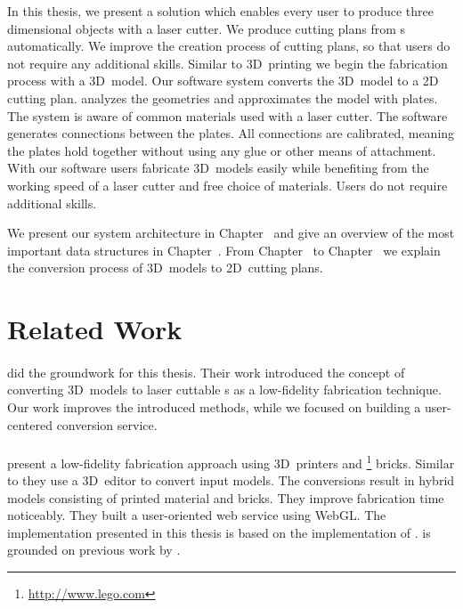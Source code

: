 \documentclass[../ClassicThesis.tex]{subfiles}
\begin{document}
In this thesis, we present a solution which enables every
user to produce three dimensional objects with a laser
cutter. We produce cutting plans from {\threedmodel}s
automatically. We improve the creation process of cutting
plans, so that users do not require any additional skills.
Similar to 3D~printing we begin the fabrication process with
a 3D~model.
Our software system {\platener} converts the 3D~model to a
2D cutting plan. {\platener} analyzes the geometries and
approximates the model with plates. The system is aware of
common materials used with a laser cutter. The software
generates connections between the plates. All connections
are calibrated, meaning the plates hold together without
using any glue or other means of attachment. With our
software users fabricate 3D~models easily while benefiting
from the working speed of a laser cutter and free choice of
materials. Users do not require additional skills.



We present our system architecture in
Chapter~ and give an overview of the
most important data structures in
Chapter~. From
Chapter~ to Chapter~ we
explain the conversion process of 3D~models to 2D~cutting
plans.

\section{Related Work}
\label{sec:related-work}

\paragraph{{\platener}} \citet{master-thesis} did the groundwork
for this thesis. Their work introduced the concept of converting
3D~models to laser cuttable {\svgfile}s as a low-fidelity fabrication
technique. Our work improves the introduced methods, while we focused
on building a user-centered conversion service.

\paragraph{{\brickify}} \citet{bachelor-thesis} present
a low-fidelity fabrication approach using 3D~printers and
{\lego}\footnote{\url{http://www.lego.com}} bricks. Similar to {\platener} they
use a 3D~editor to convert input models. The conversions
result in hybrid models consisting of printed material and
bricks. They improve fabrication time noticeably. They built
a user-oriented web service using WebGL. The implementation
presented in this thesis is based on the implementation of
{\brickify}. {\brickify} is grounded on previous work by
\citet{fabrickation}.
\end{document}
